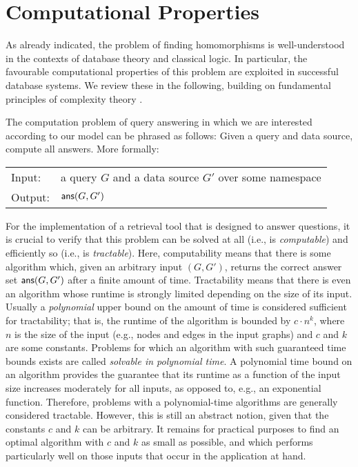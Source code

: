 \section{Computational Properties}
\label{sec:decision_problems}
\label{sec:decision_procedures}
\label{sec:computational_properties}

As already indicated, the problem of finding homomorphisms is well-understood in the contexts of
database theory and classical logic. In particular, the favourable computational properties of this problem
are exploited in successful database systems. We review these in the following,
building on fundamental principles of complexity theory \autocite{Arora2009}.

The computation problem of query answering in which we are interested according to our model can be 
phrased as follows: Given a query and data source, compute all answers.
More formally:

\begin{center}
  \begin{tabular}{ll}
    \hline\rule{0pt}{12pt}%
    Input:  & a query $G$ and a data source $G'$ over some namespace \namespace \\[2pt]
    Output: & $\textsf{ans}(G,G')$ \\[1pt]
    \hline
  \end{tabular}
\end{center}

For the implementation of a retrieval tool that is designed to answer questions,
it is crucial to verify that this problem can be solved at all (i.e., is \emph{computable})
and efficiently so (i.e., is \emph{tractable}).%
Here, computability means that there is some algorithm
which, given an arbitrary input $(G,G')$, returns the correct answer set $\textsf{ans}(G,G')$
after a finite amount of time.
Tractability means that there is even an algorithm whose runtime is strongly limited
depending on the size of its input.
Usually a \emph{polynomial} upper bound on the amount of time is
considered sufficient for tractability; that is, the runtime of the algorithm
is bounded by $c \cdot n^k$, where $n$ is the size of the input (e.g., nodes and edges in the input graphs)
and $c$ and $k$ are some constants. Problems for which an algorithm with such guaranteed time bounds exists
are called \emph{solvable in polynomial time}.
A polynomial time bound on an algorithm provides the guarantee that its runtime as a function of the input size
increases moderately for all inputs, as opposed to, e.g., an exponential function.
Therefore, problems with a polynomial-time algorithms are generally considered tractable.
However, this is still an abstract notion, given that the constants $c$ and $k$ can be arbitrary.
It remains for practical purposes to find an optimal algorithm with $c$ and $k$ as small as possible,
and which performs particularly well on those inputs that occur in the application at hand.

